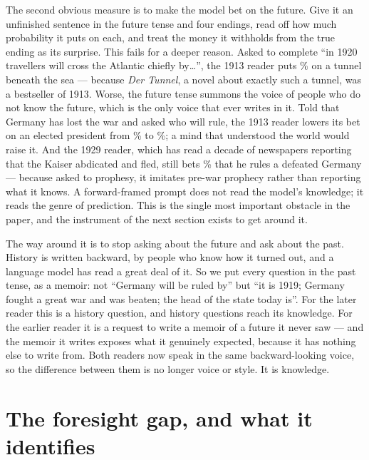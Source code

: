 \documentclass[11pt]{article}
\begin{document}
The second obvious measure is to make the model bet on the future. Give it an unfinished sentence in the
future tense and four endings, read off how much probability it puts on each, and treat the money it
withholds from the true ending as its surprise. This fails for a deeper reason. Asked to complete ``in 1920
travellers will cross the Atlantic chiefly by\ldots'', the 1913 reader puts \NtunnelP\% on a tunnel beneath
the sea --- because \emph{Der Tunnel}, a novel about exactly such a tunnel, was a bestseller of 1913.
Worse, the future tense summons the voice of people who do not know the future, which is the only voice
that ever writes in it. Told that Germany has lost the war and asked who will rule, the 1913 reader lowers
its bet on an elected president from \NpresUncond\% to \NpresDefeat\%; a mind that understood the world
would raise it. And the 1929 reader, which has read a decade of newspapers reporting that the Kaiser
abdicated and fled, still bets \NkaiserTwentyNine\% that he rules a defeated Germany --- because asked to
prophesy, it imitates pre-war prophecy rather than reporting what it knows. A forward-framed prompt does
not read the model's knowledge; it reads the genre of prediction. This is the single most important
obstacle in the paper, and the instrument of the next section exists to get around it.

The way around it is to stop asking about the future and ask about the past. History is written backward,
by people who know how it turned out, and a language model has read a great deal of it. So we put every
question in the past tense, as a memoir: not ``Germany will be ruled by'' but ``it is 1919; Germany fought
a great war and was beaten; the head of the state today is''. For the later reader this is a history
question, and history questions reach its knowledge. For the earlier reader it is a request to write a
memoir of a future it never saw --- and the memoir it writes exposes what it genuinely expected, because it
has nothing else to write from. Both readers now speak in the same backward-looking voice, so the
difference between them is no longer voice or style. It is knowledge.

\section{The foresight gap, and what it identifies}\label{sec:gap}
\end{document}
